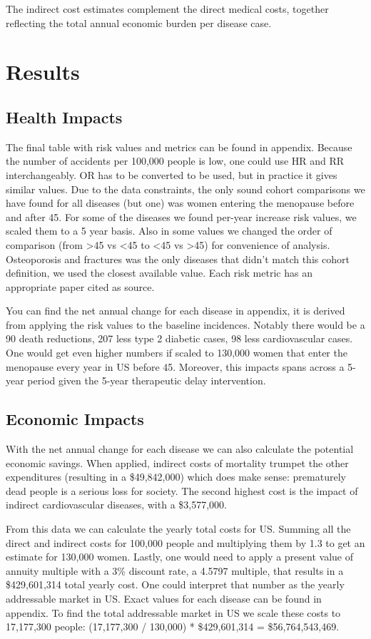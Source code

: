 \documentclass[12pt]{article}
\begin{document}
The indirect cost estimates complement the direct medical costs, together reflecting the total annual economic burden per disease case. 

\newpage
\section{Results}
\subsection{Health Impacts}
The final table with risk values and metrics can be found in appendix. Because the number of accidents per 100,000 people is low, one could use HR and RR interchangeably. OR has to be converted to be used, but in practice it gives similar values. Due to the data constraints, the only sound cohort comparisons we have found for all diseases (but one) was women entering the menopause before and after 45. For some of the diseases we found per-year increase risk values, we scaled them to a 5 year basis. Also in some values we changed the order of comparison (from >45 vs <45 to <45 vs >45) for convenience of analysis. Osteoporosis and fractures was the only diseases that didn't match this cohort definition, we used the closest available value. Each risk metric has an appropriate paper cited as source. 

You can find the net annual change for each disease in appendix, it is derived from applying the risk values to the baseline incidences. Notably there would be a 90 death reductions, 207 less type 2 diabetic cases, 98 less cardiovascular cases. One would get even higher numbers if scaled to 130,000 women that enter the menopause every year in US before 45. Moreover, this impacts spans across a 5-year period  given the 5-year therapeutic delay intervention.

\subsection{Economic Impacts}
With the net annual change for each disease we can also calculate the potential economic savings. When applied, indirect costs of mortality trumpet the other expenditures (resulting in a \$49,842,000) which does make sense: prematurely dead people is a serious loss for society. The second highest cost is the impact of indirect cardiovascular diseases, with a \$3,577,000. 

From this data we can calculate the yearly total costs for US. Summing all the direct and indirect costs for 100,000 people and multiplying them by 1.3 to get an estimate for 130,000 women. Lastly, one would need to apply a present value of annuity multiple with a 3\% discount rate, a 4.5797 multiple, that results in a \$429,601,314 total yearly cost. One could interpret that number as the yearly addressable market in US. Exact values for each disease can be found in appendix. To find the total addressable market in US we scale these costs to 17,177,300 people: (17,177,300 / 130,000) * \$429,601,314 = \$56,764,543,469.
\end{document}
